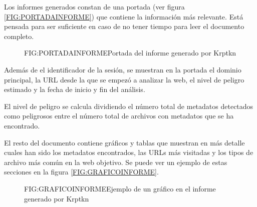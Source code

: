 Los informes generados constan de una portada (ver figura \ref{FIG:PORTADAINFORME}) que contiene la información más relevante. Está pensada para ser suficiente en caso de no tener tiempo para leer el documento completo.

\begin{figure}[portada]{FIG:PORTADAINFORME}{Portada del informe generado por Krptkn}
\end{figure}

Además de el identificador de la sesión, se muestran en la portada el dominio principal, la URL desde la que se empezó a analizar la web, el nivel de peligro estimado y la fecha de inicio y fin del análisis.

El nivel de peligro se calcula dividiendo el número total de metadatos detectados como peligrosos entre el número total de archivos con metadatos que se ha encontrado.

El resto del documento contiene gráficos y tablas que muestran en más detalle cuales han sido los metadatos encontrados, las URLs más visitadas y los tipos de archivo más común en la web objetivo. Se puede ver un ejemplo de estas secciones en la figura \ref{FIG:GRAFICOINFORME}.

\begin{figure}[graficoinforme]{FIG:GRAFICOINFORME}{Ejemplo de un gráfico en el informe generado por Krptkn}
\end{figure}
